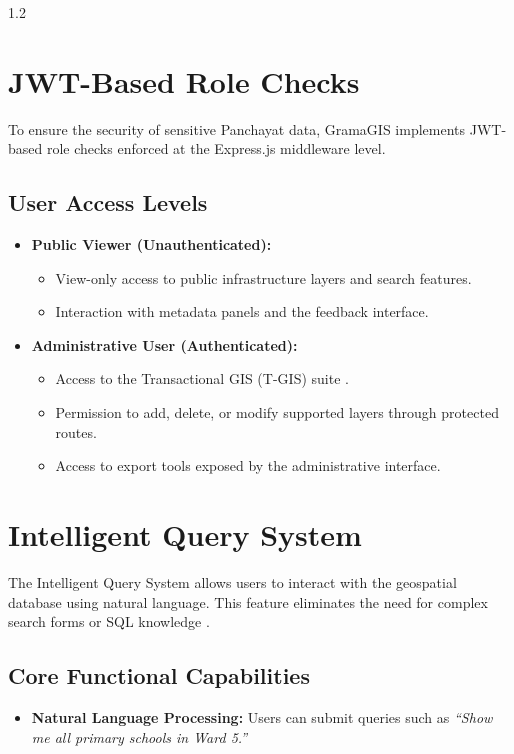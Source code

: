 \begin{spacing}{1.2}
\section{JWT-Based Role Checks}

To ensure the security of sensitive Panchayat data, GramaGIS implements JWT-based role checks enforced at the Express.js middleware level.

\subsection*{User Access Levels}

\begin{itemize}
\item \textbf{Public Viewer (Unauthenticated):}
\begin{itemize}
\item View-only access to public infrastructure layers and search features.
\item Interaction with metadata panels and the feedback interface.
\end{itemize}

\item \textbf{Administrative User (Authenticated):}
\begin{itemize}
    \item Access to the Transactional GIS (T-GIS) suite \cite{smart_panchayat2023}.
    \item Permission to add, delete, or modify supported layers through protected routes.
    \item Access to export tools exposed by the administrative interface.
\end{itemize}
\end{itemize}

\section{Intelligent Query System}

The Intelligent Query System allows users to interact with the geospatial database using natural language. This feature eliminates the need for complex search forms or SQL knowledge \cite{liu2025nalspatial}.

\subsection*{Core Functional Capabilities}

\begin{itemize}
\item \textbf{Natural Language Processing:} Users can submit queries such as \textit{``Show me all primary schools in Ward 5.''}


\end{itemize}
\end{spacing}
